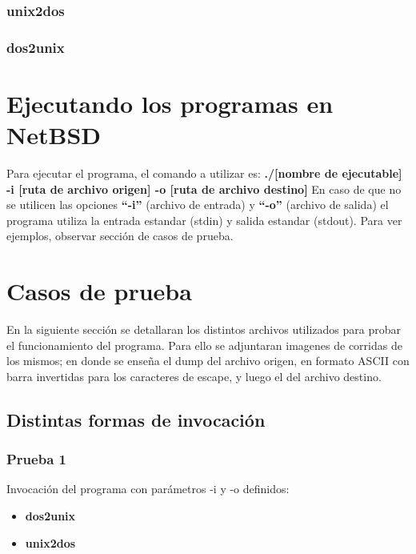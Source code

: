 \documentclass[a4paper,10pt]{article}
\begin{document}
    \subsubsection{unix2dos}
      \lstset{numbers=left, frame=single, breaklines=true}
      
    \subsubsection{dos2unix}
      \lstset{numbers=left, frame=single, breaklines=true}
      

\section{Ejecutando los programas en NetBSD}
  Para ejecutar el programa, el comando a utilizar es:
  \newline
  {\bf./[nombre de ejecutable] -i [ruta de archivo origen] -o [ruta de archivo destino]}
  \newline
  En caso de que no se utilicen las opciones {\bf ``-i''} (archivo de entrada) y {\bf ``-o''} (archivo de salida) el 
  programa utiliza la entrada estandar (stdin) y salida estandar (stdout). Para ver ejemplos, observar 
  secci\'on de casos de prueba.


\section{Casos de prueba}

En la siguiente secci\'on se detallaran los distintos archivos utilizados para probar el funcionamiento del
programa. Para ello se adjuntaran imagenes de corridas de los mismos; en donde se ense\~{n}a el dump del 
archivo origen, en formato ASCII con barra invertidas para los caracteres de escape, y luego el del 
archivo destino.

  \subsection{Distintas formas de invocaci\'on}
    \subsubsection{Prueba 1}
    Invocaci\'on del programa con par\'ametros -i y -o definidos:
    \begin{itemize}
      \item \textbf{dos2unix}
      \item \textbf{unix2dos}
    \end{itemize}
\end{document}
